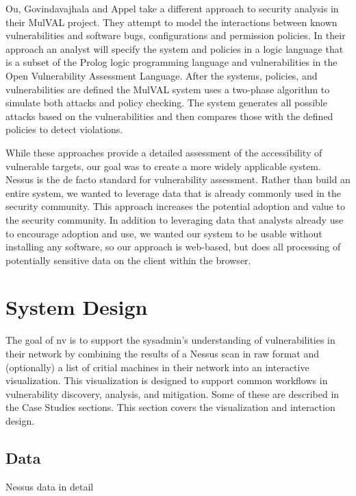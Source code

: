\documentclass{acm_proc_article-sp}
\begin{document}
Ou, Govindavajhala and Appel take a different approach to security analysis in
their MulVAL project.
They attempt to model the interactions between known vulnerabilities and
software bugs, configurations and permission policies.  In their approach an
analyst will specify the system and policies in a logic language that is a subset of the
Prolog logic programming language and vulnerabilities in the Open Vulnerability
Assessment Language. After the systems, policies, and vulnerabilities are defined
the MulVAL system uses a two-phase algorithm to simulate both attacks and policy
checking. The system generates all possible attacks based on the
vulnerabilities and then compares those with the defined policies to detect
violations.
\cite{Ou:2005:MLN:1251398.1251406}

While these approaches provide a detailed assessment of the accessibility of vulnerable targets, our goal was to create a more widely applicable system. Nessus is the de facto standard for vulnerability assessment. Rather than build an entire system, we wanted to leverage data that is already commonly used in the security community. This approach increases the potential adoption and value to the security community. In addition to leveraging data that analysts already use to encourage adoption and use, we wanted our system to be usable without installing any software, so our approach is web-based, but does all processing of potentially sensitive data on the client within the browser.

\section{System Design}
The goal of nv is to support the sysadmin's understanding of vulnerabilities in their network by combining the results of a Nessus scan in raw format and (optionally) a list of critial machines in their network into an interactive visualization.
This visualization is designed to support common workflows in vulnerability discovery, analysis, and mitigation.
Some of these are described in the Case Studies sections.
This section covers the visualization and interaction design.

\subsection{Data}
Nessus data in detail
\end{document}
